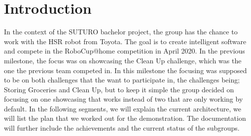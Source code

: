 \documentclass[main.tex]{subfiles}
\begin{document}
	\chapter{Introduction}
	
	In the context of the SUTURO bachelor project, the group has the chance to work with the HSR robot from Toyota. The goal is to create intelligent software and compete in the RoboCup@home competition in April 2020. 
	In the previous milestone, the focus was on showcasing the Clean Up challenge, which was the one the previous team competed in. In this milestone the focusing was supposed to be on both challenges that the want to participate in, the challenges being; Storing Groceries and Clean Up, but to keep it simple the group decided on focusing on one showcasing that works instead of two that are only working by default.
	In the following segments, we will explain the current architecture, we will list the plan that we worked out for the demonstration. The documentation will further include the achievements and the current status of the subgroups.
\end{document}
